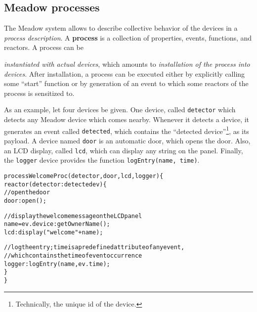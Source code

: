 \documentclass{note}
\begin{document}
\subsection{Meadow processes}\label{welcomeproc}
The Meadow system allows to describe collective behavior of the
devices in a {\em process description\/}. 
A \textcolor{blue2}{\bf process} is a collection of properties, events,
functions, and reactors. 
A process can be {\textcolor{blue2}{\em instantiated with actual devices\/},
  which amounts to {\em installation of the process into devices\/}. 
After installation, a process can be executed either by explicitly calling
some ``start'' function or by generation of an event to which some reactors
of the process is sensitized to.

As an example, let four devices be given.
One device, called \textcolor{red2}{\texttt{detector}} which detects any Meadow
device which comes nearby. Whenever it detects a device, it generates an event
called \textcolor{red2}{\texttt{detected}}, which contains the ``detected
device''\footnote{\textcolor{green2}{Technically, the unique id of the
    device.}}, as its payload. 
A device named \textcolor{red2}{\texttt{door}} is an automatic door, which
opens the door. 
Also, an LCD display, called \textcolor{red2}{\texttt{lcd}}, which can display
any string on the panel.
Finally, the \textcolor{red2}{\texttt{logger}} device provides the function
\textcolor{red2}{\texttt{logEntry(name, time)}}. 
\begin{alltt}
  \textcolor{red2}{process WelcomeProc(detector, door, lcd, logger) \{
    reactor (detector:detected ev) \{
      // open the door
      door:open();

      // display the welcome message on the LCD panel
      name = ev.device:getOwnerName();
      lcd:display("welcome" + name);

      // log the entry; time is a predefined attribute of any event,
      // which contains the time of event occurrence
      logger:logEntry(name, ev.time);
    \}
  \}}
\end{alltt}




}
\end{document}
